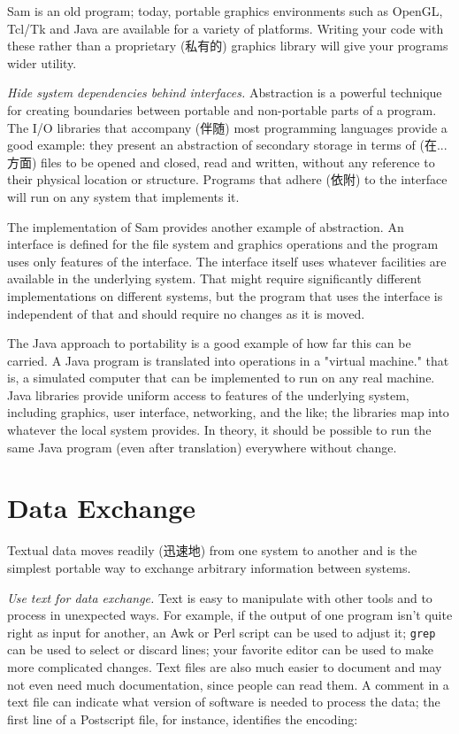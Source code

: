 Sam is an old program; today, portable graphics environments such as
OpenGL, Tcl/Tk and Java are available for a variety of platforms. Writing
your code with these rather than a proprietary (私有的) graphics library
will give your programs wider utility.

\emph{Hide system dependencies behind interfaces.} Abstraction is a
powerful technique for creating boundaries between portable and
non-portable parts of a program.  The I/O libraries that accompany (伴随)
most programming languages provide a good example: they present an
abstraction of secondary storage in terms of (在...方面) files to be opened
and closed, read and written, without any reference to their physical
location or structure. Programs that adhere (依附) to the interface will
run on any system that implements it.

The implementation of Sam provides another example of abstraction. An
interface is defined for the file system and graphics operations and the
program uses only features of the interface. The interface itself uses
whatever facilities are available in the underlying system. That might
require significantly different implementations on different systems, but
the program that uses the interface is independent of that and should
require no changes as it is moved.

The Java approach to portability is a good example of how far this can be
carried.  A Java program is translated into operations in a "virtual
machine." that is, a simulated computer that can be implemented to run on
any real machine. Java libraries provide uniform access to features of the
underlying system, including graphics, user interface, networking, and the
like; the libraries map into whatever the local system provides. In theory,
it should be possible to run the same Java program (even after translation)
everywhere without change.

\section{Data Exchange}
\label{sec:data_exchange}

Textual data moves readily (迅速地) from one system to another and is the
simplest portable way to exchange arbitrary information between systems.

\emph{Use text for data exchange.} Text is easy to manipulate with other
tools and to process in unexpected ways. For example, if the output of one
program isn't quite right as input for another, an Awk or Perl script can
be used to adjust it; \verb'grep' can be used to select or discard lines;
your favorite editor can be used to make more complicated changes. Text
files are also much easier to document and may not even need much
documentation, since people can read them. A comment in a text file can
indicate what version of software is needed to process the data; the first
line of a Postscript file, for instance, identifies the encoding:
\begin{wellcode}
\end{wellcode}

